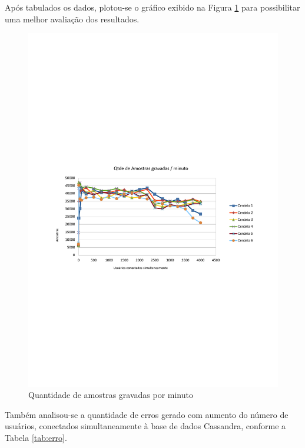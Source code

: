Após tabulados os dados, plotou-se o gráfico exibido na Figura \ref{fig:am} para possibilitar uma melhor avaliação dos resultados.




    \begin{figure}[!h]
    \centering
    \includegraphics[scale=0.85]{imagens/amXmin.pdf}
    \caption{Quantidade de amostras gravadas por minuto}
    \label{fig:am}
    \end{figure}

Também analisou-se a quantidade de erros gerado com aumento do número de usuários, conectados simultaneamente à base de dados Cassandra, conforme a Tabela \ref{tab:erro}.


